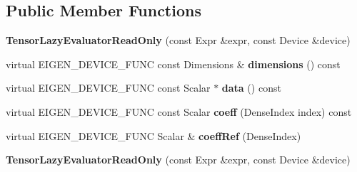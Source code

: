 \subsection*{Public Member Functions}
\begin{DoxyCompactItemize}
\item 
\mbox{\label{class_eigen_1_1internal_1_1_tensor_lazy_evaluator_read_only_a56bc12877f2a9091043edc81ef2b86f8}} 
{\bfseries Tensor\+Lazy\+Evaluator\+Read\+Only} (const Expr \&expr, const Device \&device)
\item 
\mbox{\label{class_eigen_1_1internal_1_1_tensor_lazy_evaluator_read_only_ac3ef77b98535ef4a3a2cfd6a42aa5515}} 
virtual E\+I\+G\+E\+N\+\_\+\+D\+E\+V\+I\+C\+E\+\_\+\+F\+U\+NC const Dimensions \& {\bfseries dimensions} () const
\item 
\mbox{\label{class_eigen_1_1internal_1_1_tensor_lazy_evaluator_read_only_a7c8ec665c2e9effadbf47efed7f17b5a}} 
virtual E\+I\+G\+E\+N\+\_\+\+D\+E\+V\+I\+C\+E\+\_\+\+F\+U\+NC const Scalar $\ast$ {\bfseries data} () const
\item 
\mbox{\label{class_eigen_1_1internal_1_1_tensor_lazy_evaluator_read_only_a54b066c8eeaeda76c88ea9ed7cfa8293}} 
virtual E\+I\+G\+E\+N\+\_\+\+D\+E\+V\+I\+C\+E\+\_\+\+F\+U\+NC const Scalar {\bfseries coeff} (Dense\+Index index) const
\item 
\mbox{\label{class_eigen_1_1internal_1_1_tensor_lazy_evaluator_read_only_ac5b017f1ff541a4bbd93772bdb07d5e3}} 
virtual E\+I\+G\+E\+N\+\_\+\+D\+E\+V\+I\+C\+E\+\_\+\+F\+U\+NC Scalar \& {\bfseries coeff\+Ref} (Dense\+Index)
\item 
\mbox{\label{class_eigen_1_1internal_1_1_tensor_lazy_evaluator_read_only_a56bc12877f2a9091043edc81ef2b86f8}} 
{\bfseries Tensor\+Lazy\+Evaluator\+Read\+Only} (const Expr \&expr, const Device \&device)
\item 
\mbox{\label{class_eigen_1_1internal_1_1_tensor_lazy_evaluator_read_only_ac3ef77b98535ef4a3a2cfd6a42aa5515}} 

\end{DoxyCompactItemize}
